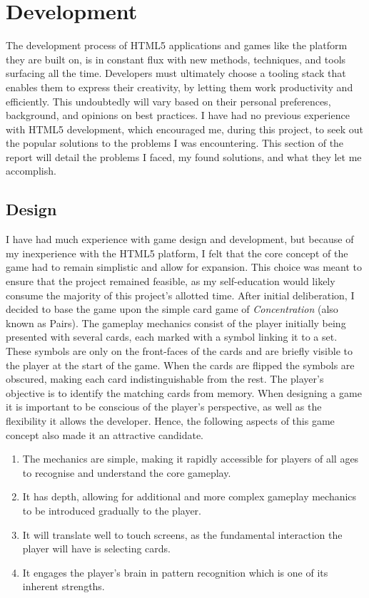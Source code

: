 \documentclass[final]{cmpreport}
\begin{document}
\section{Development}
\label{sec:dev}
The development process of HTML5 applications and games like the platform they are built on, is in constant flux with new methods, techniques, and tools surfacing all the time. Developers must ultimately choose a tooling stack that enables them to express their creativity, by letting them work productivity and efficiently. This undoubtedly will vary based on their personal preferences, background, and opinions on best practices. I have had no previous experience with HTML5 development, which encouraged me, during this project, to seek out the popular solutions to the problems I was encountering. This section of the report will detail the problems I faced, my found solutions, and what they let me accomplish. 

\subsection{Design}
I have had much experience with game design and development, but because of my inexperience with the HTML5 platform, I felt that the core concept of the game had to remain simplistic and allow for expansion. This choice was meant to ensure that the project remained feasible, as my self-education would likely consume the majority of this project's allotted time. After initial deliberation, I decided to base the game upon the simple card game of \textit{Concentration} \footnotemark (also known as Pairs). The gameplay mechanics consist of the player initially being presented with several cards, each marked with a symbol linking it to a set. These symbols are only on the front-faces of the cards and are briefly visible to the player at the start of the game. When the cards are flipped the symbols are obscured, making each card indistinguishable from the rest. The player's objective is to identify the matching cards from memory. When designing a game it is important to be conscious of the player's perspective, as well as the flexibility it allows the developer. Hence, the following aspects of this game concept also made it an attractive candidate.


\begin{enumerate}
  \item The mechanics are simple, making it rapidly accessible for players of all ages to recognise and understand the core gameplay.
  \item It has depth, allowing for additional and more complex gameplay mechanics to be introduced gradually to the player.
  \item It will translate well to touch screens, as the fundamental interaction the player will have is selecting cards.
  \item It engages the player's brain in pattern recognition which is one of its inherent strengths.
\end{enumerate}
\end{document}
